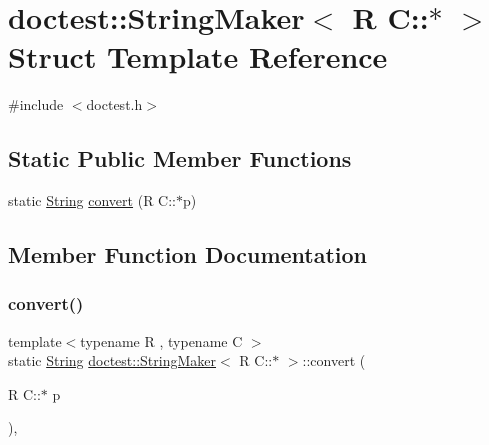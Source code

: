 \hypertarget{structdoctest_1_1_string_maker_3_01_r_01_c_1_1_5_01_4}{}\section{doctest\+:\+:String\+Maker$<$ R C\+:\+:$\ast$ $>$ Struct Template Reference}
\label{structdoctest_1_1_string_maker_3_01_r_01_c_1_1_5_01_4}


{\ttfamily \#include $<$doctest.\+h$>$}

\subsection*{Static Public Member Functions}
\begin{DoxyCompactItemize}
\item 
static \hyperlink{classdoctest_1_1_string}{String} \hyperlink{structdoctest_1_1_string_maker_3_01_r_01_c_1_1_5_01_4_a06144903aacd73ed31c2fb043be8abb0}{convert} (R C\+::$\ast$p)
\end{DoxyCompactItemize}


\subsection{Member Function Documentation}
\mbox{\label{structdoctest_1_1_string_maker_3_01_r_01_c_1_1_5_01_4_a06144903aacd73ed31c2fb043be8abb0}} 
\subsubsection{\texorpdfstring{convert()}{convert()}}
{\footnotesize\ttfamily template$<$typename R , typename C $>$ \\
static \hyperlink{classdoctest_1_1_string}{String} \hyperlink{structdoctest_1_1_string_maker}{doctest\+::\+String\+Maker}$<$ R C\+::$\ast$ $>$\+::convert (\begin{DoxyParamCaption}\item[{R C\+::$\ast$}]{p }\end{DoxyParamCaption})\hspace{0.3cm}{\ttfamily [inline]}, {\ttfamily [static]}}

